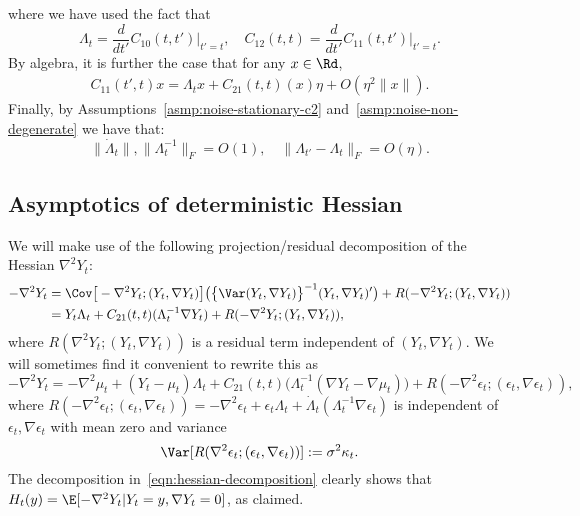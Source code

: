 \documentclass{article}
\begin{document}
	where we have used the fact that
	$$
	\Lambda_{t} = \frac{d}{dt'} C_{10}(t,t') \Big|_{t' = t}, \quad C_{12}(t,t) = \frac{d}{dt'} C_{11}(t,t')  \Big|_{t' = t}.
	$$ 
	By algebra, it is further the case that for any $x \in \Rd$,
	\begin{equation}
		\begin{aligned}
			\label{eqn:covariance-taylor-expansion-2}
			C_{11}(t',t)x = \Lambda_tx + C_{21}(t,t)(x)\eta + O(\eta^2\|x\|).
		\end{aligned}
	\end{equation}
	Finally, by Assumptions~\ref{asmp:noise-stationary-c2} and~\ref{asmp:noise-non-degenerate} we have that:
	\begin{equation}
		\label{eqn:variance-control}
		\|\dot{\Lambda}_t\|, \|\Lambda_{t}^{-1}\|_F = O(1), \quad \|\Lambda_{t'} - \Lambda_{t}\|_F = O(\eta).
	\end{equation}
	
	\subsection{Asymptotics of deterministic Hessian}
	\label{subsec:hessian-asymptotics}
	We will make use of the following projection/residual decomposition of the Hessian $\nabla^2 Y_t$:
	\begin{equation}
		\begin{aligned}
			-\nabla^2 Y_t 
			& = 
			\Cov\big[-\nabla^2 Y_t; (Y_t, \nabla Y_t)\big]\big(\big\{\Var(Y_t, \nabla Y_t)\big\}^{-1} (Y_t, \nabla Y_t)'\big) + R(-\nabla^2 Y_t; (Y_t, \nabla Y_t)) \\
			& = 
			Y_t \Lambda_t + C_{21}(t,t)(\Lambda_t^{-1} \nabla Y_t) + R(-\nabla^2 Y_t; (Y_t, \nabla Y_t)),
		\end{aligned}
	\end{equation}
	where $R(\nabla^2 Y_t; (Y_t, \nabla Y_t))$ is a residual term independent of $(Y_t, \nabla Y_t)$. We will sometimes find it convenient to rewrite this as
	\begin{equation}
		\label{eqn:hessian-decomposition}
		-\nabla^2 Y_t = -\nabla^2 \mu_t + (Y_t - \mu_t) \Lambda_t + C_{21}(t,t)\big(\Lambda_t^{-1} (\nabla Y_t - \nabla \mu_t)\big) + R(-\nabla^2 \epsilon_t; (\epsilon_t, \nabla \epsilon_t)),
	\end{equation}
	where $R(-\nabla^2 \epsilon_t; (\epsilon_t, \nabla \epsilon_t)) = -\nabla^2 \epsilon_t + \epsilon_t \Lambda_t + \dot{\Lambda}_t( \Lambda_t^{-1} \nabla \epsilon_t)$ is independent of $\epsilon_t,\nabla \epsilon_t$ with mean zero and variance
	\begin{equation}
		\label{eqn:hessian-decomposition-residual-variance}
		\Var[R(\nabla^2 \epsilon_t; (\epsilon_t, \nabla \epsilon_t))] := \sigma^2 \kappa_t.
	\end{equation} 
	The decomposition in~\eqref{eqn:hessian-decomposition} clearly shows that $H_t(y) = \E[-\nabla^2 Y_t|Y_t = y,\nabla Y_t = 0]$, as claimed.
	
\end{document}
